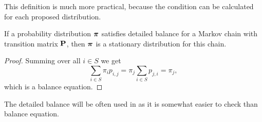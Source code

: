 	This definition is much more practical, because the condition can be calculated for each proposed distribution.
	
	\begin{theorem}
		If a probability distribution $\boldsymbol{\pi}$ satisfies detailed balance for a Markov chain with transition matrix $\mathbf{P}$, then $\boldsymbol{\pi}$ is a stationary distribution for this chain.
	\end{theorem}
	\begin{proof}
		Summing over all $i \in S$ we get
		\begin{equation*}
			\sum_{i \in S} \pi_i p_{i,j} = \pi_j \sum_{i \in S} p_{j,i} = \pi_j,
		\end{equation*}
		which is a balance equation.
	\end{proof}

	The detailed balance will be often used in as it is somewhat easier to check than balance equation.
	
	
	